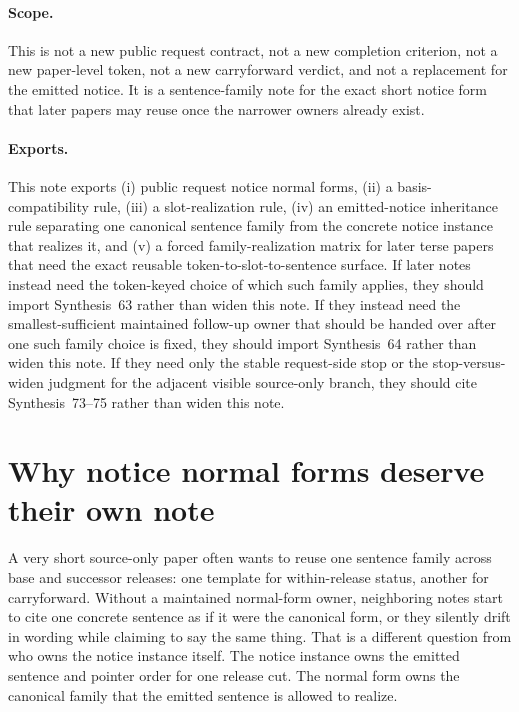 \documentclass[11pt]{article}
\begin{document}
\paragraph{Scope.}
This is not a new public request contract, not a new completion criterion, not a new paper-level token, not a new carryforward verdict, and not a replacement for the emitted notice.
It is a sentence-family note for the exact short notice form that later papers may reuse once the narrower owners already exist.

\paragraph{Exports.}
This note exports (i) public request notice normal forms, (ii) a basis-compatibility rule, (iii) a slot-realization rule, (iv) an emitted-notice inheritance rule separating one canonical sentence family from the concrete notice instance that realizes it, and (v) a forced family-realization matrix for later terse papers that need the exact reusable token-to-slot-to-sentence surface. If later notes instead need the token-keyed choice of which such family applies, they should import Synthesis~63 rather than widen this note. If they instead need the smallest-sufficient maintained follow-up owner that should be handed over after one such family choice is fixed, they should import Synthesis~64 rather than widen this note. If they need only the stable request-side stop or the stop-versus-widen judgment for the adjacent visible source-only branch, they should cite Synthesis~73--75 rather than widen this note.

\section{Why notice normal forms deserve their own note}
A very short source-only paper often wants to reuse one sentence family across base and successor releases: one template for within-release status, another for carryforward.
Without a maintained normal-form owner, neighboring notes start to cite one concrete sentence as if it were the canonical form, or they silently drift in wording while claiming to say the same thing.
That is a different question from who owns the notice instance itself.
The notice instance owns the emitted sentence and pointer order for one release cut.
The normal form owns the canonical family that the emitted sentence is allowed to realize.
\end{document}
